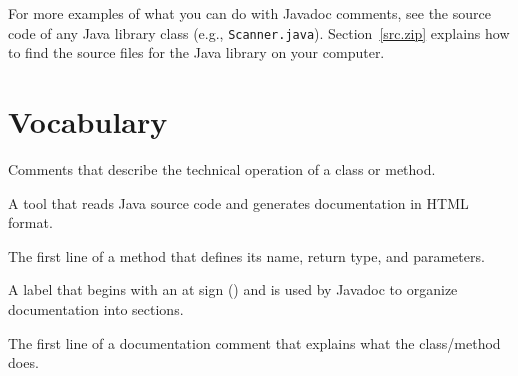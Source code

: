 For more examples of what you can do with Javadoc comments, see the source code of any Java library class (e.g., {\tt Scanner.java}).
Section~\ref{src.zip} explains how to find the source files for the Java library on your computer.


\section{Vocabulary}

\begin{description}

Comments that describe the technical operation of a class or method.

A tool that reads Java source code and generates documentation in HTML format.

The first line of a method that defines its name, return type, and parameters.

A label that begins with an at sign () and is used by Javadoc to organize documentation into sections.

The first line of a documentation comment that explains what the class/method does.

\end{description}
